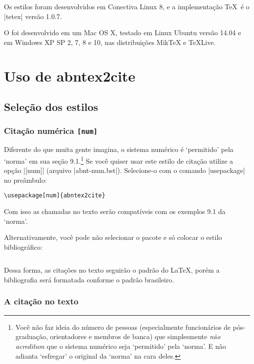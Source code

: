 \documentclass[a4paper]{ltxdoc}
\begin{document}
Os estilos foram desenvolvidos em Conectiva Linux 8, e a implementação \TeX\ é
o |tetex| versão 1.0.7.

O  foi desenvolvido em um Mac OS X, testado em Linux Ubuntu versão 14.04
e em Windows XP SP 2, 7, 8 e 10, nas distribuições MikTeX e TeXLive.

\section{Uso de \textsf{abntex2cite}}

\subsection{Seleção dos estilos}

\subsubsection{Citação numérica \tt{[num]}}

\DescribeMacro{\usepackage[num]{abntex2cite}}
Diferente do que muita gente imagina, o sistema numérico é `permitido'  pela
`norma'\cite{NBR6023:2000} em sua seção 9.1.\footnote{Você não faz ideia do
número de pessoas (especialmente funcionários de pós-graduação, orientadores e
membros de banca) que simplesmente \emph{não acreditam} que o sistema numérico
seja `permitido' pela `norma'. E não adianta `esfregar' o original da `norma' na
cara deles.} Se você quiser usar este estilo de citação utilize a opção |[num]|
(arquivo |abnt-num.bst|). Selecione-o com o comando |usepackage| no preâmbulo:

\begin{verbatim}
\usepackage[num]{abntex2cite}
\end{verbatim}

Com isso as chamadas no texto serão compatíveis com os exemplos 9.1 da
`norma'\cite{NBR6023:2000}.

\DescribeMacro{}
Alternativamente, você pode não selecionar o pacote e só colocar o estilo
bibliográfico:

\begin{verbatim}

\end{verbatim}

Dessa forma, as citações no texto seguirão o padrão do \LaTeX, porém a
bibliografia será formatada conforme o padrão brasileiro.

\subsubsection{A citação no texto}
\end{document}
